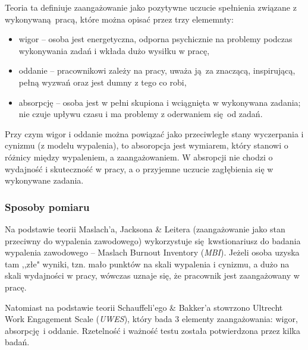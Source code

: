 \begin{description}
Teoria ta definiuje zaangażowanie jako pozytywne uczucie spełnienia związane z wykonywaną pracą, które można opisać przez trzy elememnty:
\begin{itemize}
\item wigor -- osoba jest energetyczna, odporna psychicznie na problemy podczas wykonywania zadań i wkłada dużo wysiłku w pracę,
\item oddanie -- pracownikowi zależy na pracy, uważa ją za znaczącą, inspirującą, pełną wyzwań oraz jest dumny z tego co robi,
\item absorpcję -- osoba jest w pełni skupiona i wciągnięta w wykonywana zadania; nie czuje upływu czasu i ma problemy z oderwaniem się od zadań.
\end{itemize}
Przy czym wigor i oddanie można powiązać jako przeciwległe stany wyczerpania i cynizmu (z modelu wypalenia), to absoropcja jest wymiarem, który stanowi o różnicy między wypaleniem, a zaangażowaniem. W absropcji nie chodzi o wydajność i skuteczność w pracy, a o przyjemne uczucie zagłębienia się w wykonywane zadania.
\end{description}

\subsubsection{Sposoby pomiaru}
Na podstawie teorii Maslach'a, Jacksona \& Leitera (zaangażowanie jako stan przeciwny do wypalenia zawodowego) wykorzystuje się kwstionariusz do badania wypalenia zawodowego -- Maslach Burnout Inventory (\emph{MBI}). Jeżeli osoba uzyska tam ,,złe" wyniki, tzn. mało punktów na skali wypalenia i cynizmu, a dużo na skali wydajności w pracy, wówczas uznaje się, że pracownik jest zaangażowany w pracę.

Natomiast na podstawie teorii Schauffeli'ego \& Bakker'a stowrzono Ultrecht Work Engagement Scale (\emph{UWES}), który bada 3 elementy zaangażowania: wigor, absorpcję i oddanie. Rzetelność i ważność testu została potwierdzona przez kilka badań.


